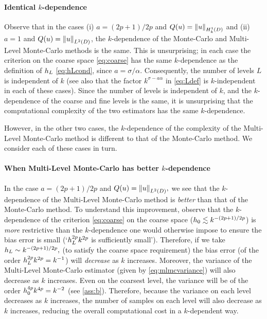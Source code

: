 \paragraph{Identical $k$-dependence} Observe that in the cases (i) $a = (2p+1)/2p$ and $Q(u) = \NHokD{u}$ and (ii) $a=1$ and $Q(u) = \NLtD{u}$, the $k$-dependence of the Monte-Carlo and Multi-Level Monte-Carlo methods is the same. This is unsurprising; in each case the criterion on the coarse space \cref{eq:coarse} has the same $k$-dependence as the definition of $h_{L}$ \cref{eq:hLcond}, since $a = \sigma/\alpha.$ Consequently, the number of levels $L$ is independent of $k$ (see also that the factor $k^{\sigma - a\alpha}$ in \cref{eq:Ldef} is $k$-independent in each of these cases). Since the number of levels is independent of $k$, and the $k$-dependence of the coarse and fine levels is the same, it is unsurprising that the computational complexity of the two estimators has the same $k$-dependence.

However, in the other two cases, the $k$-dependence of the complexity of the Multi-Level Monte-Carlo method is different to that of the Monte-Carlo method. We consider each of these cases in turn.

\paragraph{When Multi-Level Monte-Carlo has better $k$-dependence} In the case $a=(2p+1)/2p$ and $Q(u) = \NLtD{u},$ we see that the $k$-dependence of the Multi-Level Monte-Carlo method is \emph{better} than that of the Monte-Carlo method. To understand this improvement, observe that the $k$-dependence of the criterion \cref{eq:coarse} on the coarse space ($h_{0} \lesssim k^{-(2p+1)/2p}$) is \emph{more} restrictive than the $k$-dependence one would otherwise impose to ensure the bias error is small (`$h_{L}^{2p}k^{2p}$ is sufficiently small'). Therefore, if we take $h_{L} \sim k^{-(2p+1)/2p},$ (to satisfy the coarse space requirement) the bias error (of the order $h_{L}^{2p}k^{2p} = k^{-1}$) will \emph{decrease} as $k$ increases. Moreover, the variance of the Multi-Level Monte-Carlo estimator (given by \cref{eq:mlmcvariance}) will also decrease as $k$ increases. Even on the coarsest level, the variance will be of the order $h_{0}^{4p}k^{4p} = k^{-2}$ (see \cref{ass:b}). Therefore, because the variance on each level decreases as $k$ increases, the number of samples on each level will also decrease as $k$ increases, reducing the overall computational cost in a $k$-dependent way.

